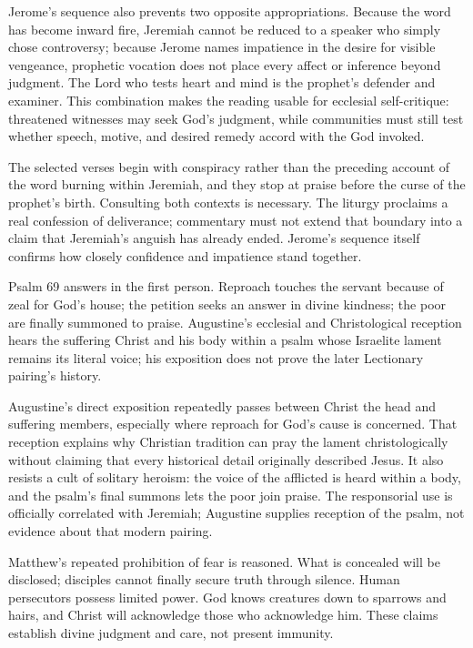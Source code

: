 \begin{deepstudy}
Jerome's sequence also prevents two opposite appropriations. Because the word has become inward fire, Jeremiah cannot be reduced to a speaker who simply chose controversy; because Jerome names impatience in the desire for visible vengeance, prophetic vocation does not place every affect or inference beyond judgment. The Lord who tests heart and mind is the prophet's defender and examiner. This combination makes the reading usable for ecclesial self-critique: threatened witnesses may seek God's judgment, while communities must still test whether speech, motive, and desired remedy accord with the God invoked.

The selected verses begin with conspiracy rather than the preceding account of the word burning within Jeremiah, and they stop at praise before the curse of the prophet's birth. Consulting both contexts is necessary. The liturgy proclaims a real confession of deliverance; commentary must not extend that boundary into a claim that Jeremiah's anguish has already ended. Jerome's sequence itself confirms how closely confidence and impatience stand together.

Psalm 69 answers in the first person. Reproach touches the servant because of zeal for God's house; the petition seeks an answer in divine kindness; the poor are finally summoned to praise. Augustine's ecclesial and Christological reception hears the suffering Christ and his body within a psalm whose Israelite lament remains its literal voice; his exposition does not prove the later Lectionary pairing's history.

Augustine's direct exposition repeatedly passes between Christ the head and suffering members, especially where reproach for God's cause is concerned. That reception explains why Christian tradition can pray the lament christologically without claiming that every historical detail originally described Jesus. It also resists a cult of solitary heroism: the voice of the afflicted is heard within a body, and the psalm's final summons lets the poor join praise. The responsorial use is officially correlated with Jeremiah; Augustine supplies reception of the psalm, not evidence about that modern pairing.

Matthew's repeated prohibition of fear is reasoned. What is concealed will be disclosed; disciples cannot finally secure truth through silence. Human persecutors possess limited power. God knows creatures down to sparrows and hairs, and Christ will acknowledge those who acknowledge him. These claims establish divine judgment and care, not present immunity.


\end{deepstudy}

